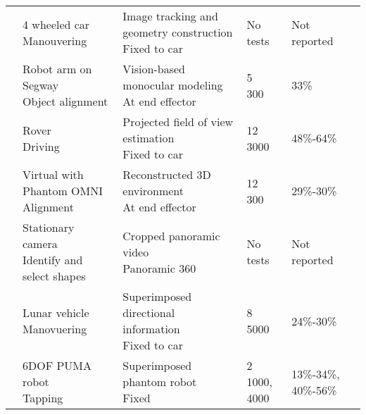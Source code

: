 \begin{table}[]
{\begin{tabular}{@{}lllll@{}}
	\addlinespace
	\cite{Hu2015}            & \makecell[lt]{4 wheeled car\\ Manouvering}                    & \makecell[lt]{Image tracking and geometry construction\\ Fixed to car}     & No tests                                                     & Not reported         \\
	\addlinespace
	\cite{Lovi2010}          & \makecell[lt]{Robot arm on Segway\\ Object alignment}         & \makecell[lt]{Vision-based monocular modeling\\ At end effector}           & \makecell[lt]{5\\ 300}            & 33\%                 \\
	\addlinespace
	\cite{Matheson2013}      & \makecell[lt]{Rover\\ Driving}                                & \makecell[lt]{Projected field of view estimation\\ Fixed to car}           & \makecell[lt]{12\\ 3000}          & 48\%-64\%            \\
	\addlinespace
	\cite{Rachmielowski2010} & \makecell[lt]{Virtual with Phantom OMNI\\ Alignment}          & \makecell[lt]{Reconstructed 3D environment\\ At end effector}              & \makecell[lt]{12\\ 300}           & 29\%-30\%            \\
	\addlinespace
	\cite{Baldwin1999}       & \makecell[lt]{Stationary camera\\ Identify and select shapes} & \makecell[lt]{Cropped panoramic video\\ Panoramic 360}                     & No tests                                                     & Not reported         \\
	\addlinespace
	\cite{Mathan1996}        & \makecell[lt]{Lunar vehicle\\ Manovuering}                    & \makecell[lt]{Superimposed directional information\\ Fixed to car}         & \makecell[lt]{8\\ 5000}           & 24\%-30\%            \\
	\addlinespace
	\cite{Bejczy1990}        & \makecell[lt]{6DOF PUMA robot\\ Tapping}                      & \makecell[lt]{Superimposed phantom robot\\ Fixed}                          & \makecell[lt]{2\\ 1000, 4000}     & 13\%-34\%, 40\%-56\% \\ \bottomrule
	\end{tabular}
}
\end{table}